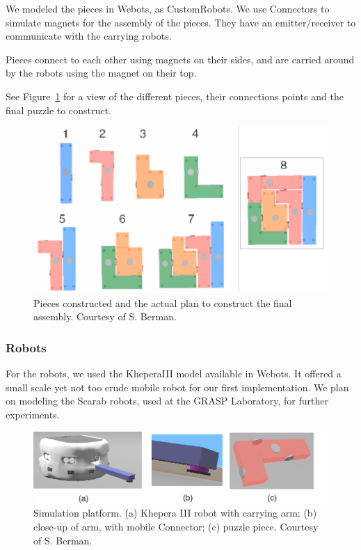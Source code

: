 \documentclass[letterpaper, oneside]{article}
\begin{document}
We modeled the pieces in Webots, as CustomRobots. We use Connectors to simulate magnets for the assembly of the pieces. They have an emitter/receiver to communicate with the carrying robots.

Pieces connect to each other using magnets on their sides, and are carried around by the robots using the magnet on their top.

See Figure~\ref{fig:img_assembly_plan} for a view of the different pieces, their connections points and the final puzzle to construct.

\begin{figure}[h!]
	\centering
		\includegraphics[width=12cm]{img/assembly_plan.pdf}
	\caption{Pieces constructed and the actual plan to construct the final assembly. Courtesy of S. Berman.}
	\label{fig:img_assembly_plan}
\end{figure}

\subsubsection{Robots} %
\label{ssub:robots}


For the robots, we used the KheperaIII model available in Webots. It offered a small scale yet not too crude mobile robot for our first implementation. We plan on modeling the Scarab robots, used at the GRASP Laboratory, for further experiments.

\begin{figure}[h]
	\centering
		\includegraphics[width=14cm]{img/SimSetup.pdf}
	\caption{Simulation platform.  (a) Khepera III robot with carrying arm; (b) close-up of arm, with mobile Connector; (c) puzzle piece. Courtesy of S. Berman.}
	\label{fig:img_SimSetup}
\end{figure}
\end{document}
